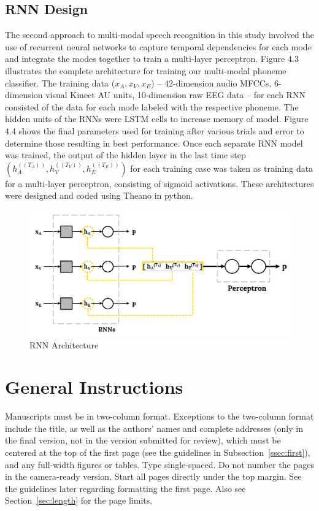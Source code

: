 \documentclass[11pt,letterpaper]{article}
\begin{document}
\subsection{RNN Design}
The second approach to multi-modal speech recognition in this study involved the use of recurrent neural networks to capture temporal dependencies for each mode and integrate the modes together to train a multi-layer perceptron. Figure 4.3 illustrates the complete architecture for training our multi-modal phoneme classifier. The training data ($x_A,x_V,x_E$) – 42-dimension audio MFCCs, 6-dimension visual Kinect AU units, 10-dimension raw EEG data – for each RNN consisted of the data for each mode labeled with the respective phoneme. The hidden units of the RNNs were LSTM cells to increase memory of model. Figure 4.4 shows the final parameters used for training after various trials and error to determine those resulting in best performance. Once each separate RNN model was trained, the output of the hidden layer in the last time step $(h_A^((T_A ) ),h_V^((T_V ) ),h_E^((T_E ) ))$ for each training case was taken as training data for a multi-layer perceptron, consisting of sigmoid activations. These architectures were designed and coded using Theano in python.

\begin{figure}[h]
\centering
\includegraphics[scale=0.25]{rnn_design}
\caption{RNN Architecture}
\end{figure}


\section{General Instructions}



Manuscripts must be in two-column format.  Exceptions to the two-column
format include the title, as well as the authors' names and complete
addresses (only in the final version, not in the version submitted for
review), which must be centered at the top of the first page (see the
guidelines in Subsection~\ref{ssec:first}), and any full-width figures or
tables.  Type single-spaced.  Do not number the pages in the camera-ready
version. Start all pages directly under the top margin.  See the guidelines
later regarding formatting the first page.  Also see 
Section~\ref{sec:length} for the page limits.
\end{document}
